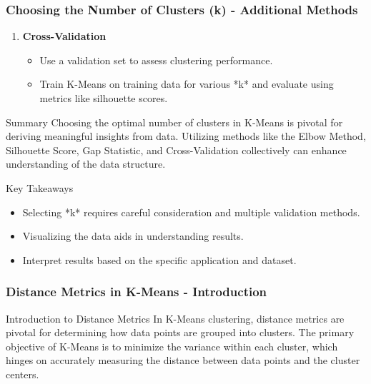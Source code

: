 \documentclass[aspectratio=169]{beamer}
\begin{document}
\begin{frame}[fragile]
  \frametitle{Choosing the Number of Clusters (k) - Additional Methods}
  \begin{enumerate}[resume]
    \item \textbf{Cross-Validation}
    \begin{itemize}
      \item Use a validation set to assess clustering performance.
      \item Train K-Means on training data for various *k* and evaluate using metrics like silhouette scores.
    \end{itemize}
  \end{enumerate}
  
  \begin{block}{Summary}
    Choosing the optimal number of clusters in K-Means is pivotal for deriving meaningful insights from data. Utilizing methods like the Elbow Method, Silhouette Score, Gap Statistic, and Cross-Validation collectively can enhance understanding of the data structure.
  \end{block}
  
  \begin{block}{Key Takeaways}
    \begin{itemize}
      \item Selecting *k* requires careful consideration and multiple validation methods.
      \item Visualizing the data aids in understanding results.
      \item Interpret results based on the specific application and dataset.
    \end{itemize}
  \end{block}
\end{frame}

\begin{frame}[fragile]
    \frametitle{Distance Metrics in K-Means - Introduction}
    \begin{block}{Introduction to Distance Metrics}
        In K-Means clustering, distance metrics are pivotal for determining how data points are grouped into clusters. The primary objective of K-Means is to minimize the variance within each cluster, which hinges on accurately measuring the distance between data points and the cluster centers.
    \end{block}
\end{frame}
\end{document}

